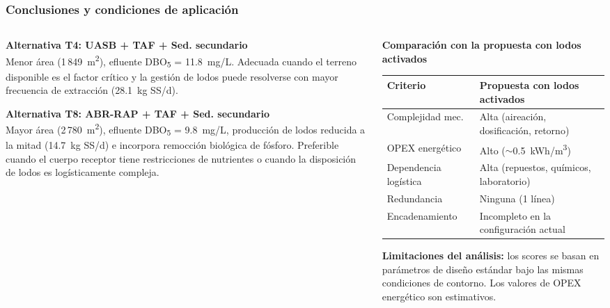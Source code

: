 \documentclass[aspectratio=169]{beamer}
\begin{document}
\begin{frame}
\frametitle{Conclusiones y condiciones de aplicaci\'{o}n}
\begin{columns}[T]
\begin{column}{0.50\textwidth}
\textbf{Alternativa T4: UASB + TAF + Sed. secundario}\\[4pt]
\small
Menor \'{a}rea (1\,849~m\textsuperscript{2}), efluente DBO\textsubscript{5} = 11.8~mg/L. Adecuada cuando el terreno disponible es el factor cr\'{i}tico y la gesti\'{o}n de lodos puede resolverse con mayor frecuencia de extracci\'{o}n (28.1~kg SS/d).

\vspace{8pt}
\textbf{Alternativa T8: ABR-RAP + TAF + Sed. secundario}\\[4pt]
\small
Mayor \'{a}rea (2\,780~m\textsuperscript{2}), efluente DBO\textsubscript{5} = 9.8~mg/L, producci\'{o}n de lodos reducida a la mitad (14.7~kg SS/d) e incorpora remocci\'{o}n biol\'{o}gica de f\'{o}sforo. Preferible cuando el cuerpo receptor tiene restricciones de nutrientes o cuando la disposici\'{o}n de lodos es log\'{i}sticamente compleja.
\end{column}
\begin{column}{0.48\textwidth}
\textbf{Comparaci\'{o}n con la propuesta con lodos activados}\\[4pt]
\footnotesize
\begin{tabular}{p{2.6cm}p{3.6cm}}
\toprule
Criterio & Propuesta con lodos activados \\
\midrule
Complejidad mec. & Alta (aireaci\'{o}n, dosificaci\'{o}n, retorno) \\
OPEX energ\'{e}tico & Alto ($\sim$0.5~kWh/m\textsuperscript{3}) \\
Dependencia log\'{i}stica & Alta (repuestos, qu\'{i}micos, laboratorio) \\
Redundancia & Ninguna (1 l\'{i}nea) \\
Encadenamiento & Incompleto en la configuraci\'{o}n actual \\
\bottomrule
\end{tabular}
\vspace{6pt}

\footnotesize
\textbf{Limitaciones del an\'{a}lisis:} los scores se basan en par\'{a}metros de dise\~{n}o est\'{a}ndar bajo las mismas condiciones de contorno. Los valores de OPEX energ\'{e}tico son estimativos.
\end{column}
\end{columns}
\end{frame}
\end{document}
